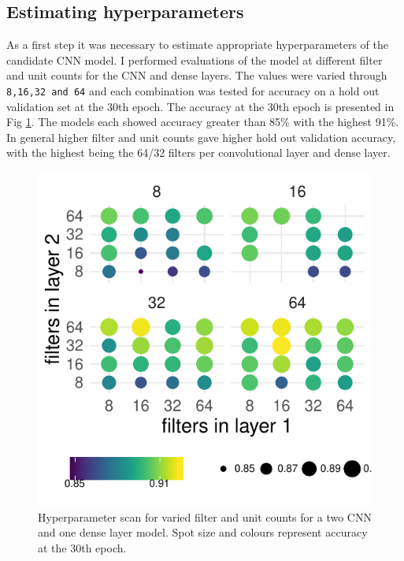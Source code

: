 \documentclass[12pt,a4paper,]{article}
\begin{document}
\hypertarget{estimating-hyperparameters}{%
\subsection{Estimating hyperparameters}\label{estimating-hyperparameters}}

As a first step it was necessary to estimate appropriate hyperparameters of the candidate CNN model. I performed evaluations of the model at different filter and unit counts for the CNN and dense layers. The values were varied through \texttt{8,16,32\ and\ 64} and each combination was tested for accuracy on a hold out validation set at the 30th epoch. The accuracy at the 30th epoch is presented in Fig \ref{fig:paramscan}. The models each showed accuracy greater than 85\% with the highest 91\%. In general higher filter and unit counts gave higher hold out validation accuracy, with the highest being the 64/32 filters per convolutional layer and dense layer.

\begin{figure}
\centering
\includegraphics{../analysis/figure1.pdf}
\caption{\label{fig:paramscan}Hyperparameter scan for varied filter and unit counts for a two CNN and one dense layer model. Spot size and colours represent accuracy at the 30th epoch.}
\end{figure}
\end{document}
